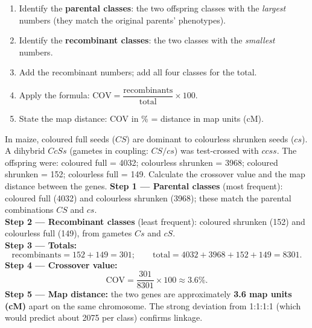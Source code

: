 \documentclass[11pt]{article}
\begin{document}
\begin{methode}
\begin{enumerate}
\item Identify the \textbf{parental classes}: the two offspring classes with the \emph{largest} numbers (they match the original parents' phenotypes).
\item Identify the \textbf{recombinant classes}: the two classes with the \emph{smallest} numbers.
\item Add the recombinant numbers; add all four classes for the total.
\item Apply the formula: $\text{COV} = \dfrac{\text{recombinants}}{\text{total}} \times 100$.
\item State the map distance: COV in \% = distance in map units (cM).
\end{enumerate}
\end{methode}

\begin{exoresolu}
In maize, coloured full seeds ($CS$) are dominant to colourless shrunken seeds ($cs$). A dihybrid $CcSs$ (gametes in coupling: $CS/cs$) was test-crossed with $ccss$. The offspring were: coloured full = 4032; colourless shrunken = 3968; coloured shrunken = 152; colourless full = 149. Calculate the crossover value and the map distance between the genes.
\tcblower
\textbf{Step 1 --- Parental classes} (most frequent): coloured full (4032) and colourless shrunken (3968); these match the parental combinations $CS$ and $cs$.\\
\textbf{Step 2 --- Recombinant classes} (least frequent): coloured shrunken (152) and colourless full (149), from gametes $Cs$ and $cS$.\\
\textbf{Step 3 --- Totals:}
\[ \text{recombinants} = 152 + 149 = 301; \qquad \text{total} = 4032 + 3968 + 152 + 149 = 8301. \]
\textbf{Step 4 --- Crossover value:}
\[ \text{COV} = \frac{301}{8301} \times 100 \approx 3.6\%. \]
\textbf{Step 5 --- Map distance:} the two genes are approximately \textbf{3.6 map units (cM)} apart on the same chromosome. The strong deviation from 1:1:1:1 (which would predict about 2075 per class) confirms linkage.
\end{exoresolu}
\end{document}
